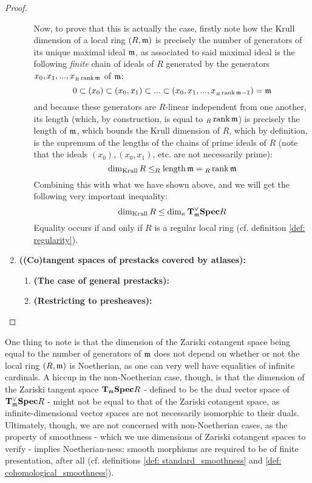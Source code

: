 \begin{proof}
\begin{enumerate}
\begin{enumerate}
                                Now, to prove that this is actually the case, firstly note how the Krull dimension of a local ring $(R, \mathfrak{m})$ is precisely the number of generators of its unique maximal ideal $\mathfrak{m}$, as associated to said maximal ideal is the following \textit{finite} chain of ideals of $R$ generated by the generators $x_0, x_1, ..., x_{{}_R\operatorname{rank} \mathfrak{m}}$ of $\mathfrak{m}$:
                                    $$0 \subset (x_0) \subset (x_0, x_1) \subset ... \subset (x_0, x_1, ..., x_{{}_R\operatorname{rank} \mathfrak{m} - 1}) = \mathfrak{m}$$
                                and because these generators are $R$-linear independent from one another, its length (which, by construction, is equal to ${}_R\operatorname{rank} \mathfrak{m}$) is precisely the length of $\mathfrak{m}$, which bounds the Krull dimension of $R$, which by definition, is the supremum of the lengths of the chains of prime ideals of $R$ (note that the ideals $(x_0), (x_0, x_1)$, etc. are not necessarily prime):
                                    $$\dim_{\mathrm{Krull}} R \leq _R\operatorname{length} \mathfrak{m} = {}_R\operatorname{rank} \mathfrak{m}$$
                                Combining this with what we have shown above, and we will get the following very important inequality:
                                    $$\dim_{\mathrm{Krull}} R \leq \dim_{\kappa} \mathbf{T}^{\vee}_{\mathfrak{m}} \mathbf{Spec} R$$
                                Equality occurs if and only if $R$ is a regular local ring (cf. definition \ref{def: regularity}).
                            \end{enumerate}
                        \item \textbf{\textbf{((Co)tangent spaces of prestacks covered by atlases):}} 
                            \begin{enumerate}
                                \item \textbf{(The case of general prestacks):}
                                \item \textbf{(Restricting to presheaves):}
                            \end{enumerate}
                    \end{enumerate}
                \end{proof}
            \begin{remark}
                One thing to note is that the dimension of the Zariski cotangent space being equal to the number of generators of $\mathfrak{m}$ does not depend on whether or not the local ring $(R, \mathfrak{m})$ is Noetherian, as one can very well have equalities of infinite cardinals. A hiccup in the non-Noetherian case, though, is that the dimension of the Zariski tangent space $\mathbf{T}_{\mathfrak{m}}\mathbf{Spec} R$ - defined to be the dual vector space of $\mathbf{T}^{\vee}_{\mathfrak{m}}\mathbf{Spec} R$ - might not be equal to that of the Zariski cotangent space, as infinite-dimensional vector spaces are not necessarily isomorphic to their duals. Ultimately, though, we are not concerned with non-Noetherian cases, as the property of smoothness - which we use dimensions of Zariski cotangent spaces to verify - implies Noetherian-ness: smooth morphisms are required to be of finite presentation, after all (cf. definitions \ref{def: standard_smoothness} and \ref{def: cohomological_smoothness}).
            \end{remark}
                
